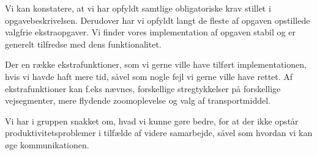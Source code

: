 Vi kan konstatere, at vi har opfyldt samtlige obligatoriske krav stillet i opgavebeskrivelsen. Derudover har vi opfyldt langt de fleste af opgaven opstillede valgfrie ekstraopgaver. Vi finder vores implementation af opgaven stabil og er generelt tilfredse med dens funktionalitet. 

Der en række ekstrafunktioner, som vi gerne ville have tilført implementationen, hvis vi havde haft mere tid, såvel som nogle fejl vi gerne ville have rettet. Af ekstrafunktioner kan f.eks nævnes, forskellige stregtykkelser på forskellige vejsegmenter, mere flydende zoomoplevelse og valg af transportmiddel. 

Vi har i gruppen snakket om, hvad vi kunne gøre bedre, for at der ikke opstår produktivitetsproblemer i tilfælde af videre samarbejde, såvel som hvordan vi kan øge kommunikationen.